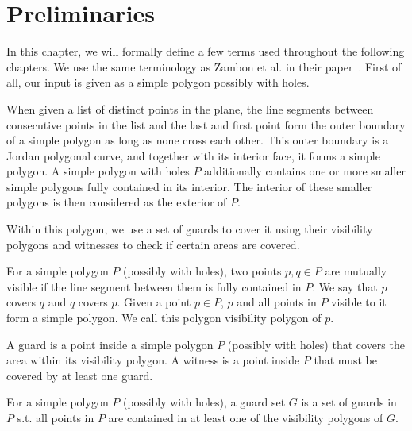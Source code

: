 \chapter{Preliminaries}\label{ch:preliminaries}
In this chapter, we will formally define a few terms used throughout the following chapters. We use the same terminology as Zambon et al. in their paper~\cite{zambon2014exact}.
First of all, our input is given as a simple polygon possibly with holes.

\begin{definition}
When given a list of distinct points in the plane, the line segments between consecutive points in the list and the last and first point form the outer boundary of a simple polygon as long as none cross each other. This outer boundary is a Jordan polygonal curve, and together with its interior face, it forms a simple polygon. A simple polygon with holes $P$ additionally contains one or more smaller simple polygons fully contained in its interior. The interior of these smaller polygons is then considered as the exterior of $P$.
\end{definition}

Within this polygon, we use a set of guards to cover it using their visibility polygons and witnesses to check if certain areas are covered.

\begin{definition}
For a simple polygon $P$ (possibly with holes), two points $p,q\in P$ are mutually visible if the line segment between them is fully contained in $P$. We say that $p$ covers $q$ and $q$ covers $p$. Given a point $p\in P$, $p$ and all points in $P$ visible to it form a simple polygon. We call this polygon visibility polygon of $p$.
\end{definition}

\begin{definition}
A guard is a point inside a simple polygon $P$ (possibly with holes) that covers the area within its visibility polygon. A witness is a point inside $P$ that must be covered by at least one guard.
\end{definition}

\begin{definition}
For a simple polygon $P$ (possibly with holes), a guard set $G$ is a set of guards in $P$ s.t. all points in $P$ are contained in at least one of the visibility polygons of $G$.
\end{definition}

